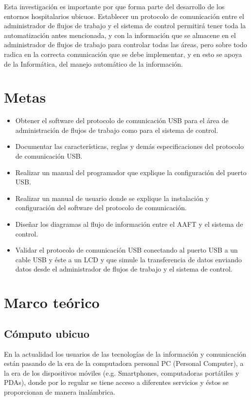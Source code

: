 \vspace{0.2cm}

Esta investigación es importante por que forma parte del
desarrollo de los entornos hospitalarios ubicuos. Establecer un
protocolo de comunicación entre el administrador de flujos de
trabajo y el sistema de control permitirá tener toda la
automatización antes mencionada, y con la información que se
almacene en el administrador de flujos de trabajo para controlar
todas las áreas, pero sobre todo radica en la correcta
comunicación que se debe implementar, y en esto se apoya de la
Informática, del manejo
automático de la información.\\

\vspace{0.2cm}

\section{Metas}
\begin{itemize}
    \item Obtener el software del protocolo de comunicación USB para el área de administración de flujos de trabajo como para el sistema de control.
    \item Documentar las características, reglas y demás especificaciones del protocolo de comunicación USB.
    \item Realizar un manual del programador que explique la configuración del puerto USB.
    \item Realizar un manual de usuario donde se explique la instalación y configuración del software del protocolo de comunicación.
    \item Diseñar los diagramas al flujo de información entre el AAFT y el sistema de control.
    \item Validar el protocolo de comunicación USB conectando al puerto USB a un cable USB y éste a un LCD y que simule la transferencia de datos enviando datos desde el administrador de flujos de trabajo y el sistema de control.
\end{itemize}

\newpage
\section{Marco teórico}

\subsection{Cómputo ubicuo}
En la actualidad los usuarios de las tecnologías de la información
y comunicación están pasando de la era de la computadora personal
PC (Personal Computer), a la era de los dispositivos móviles (e.g.
Smartphones, computadoras portátiles y PDAs), donde por lo regular
se tiene acceso a diferentes servicios y éstos se proporcionan de
manera inalámbrica.\\


